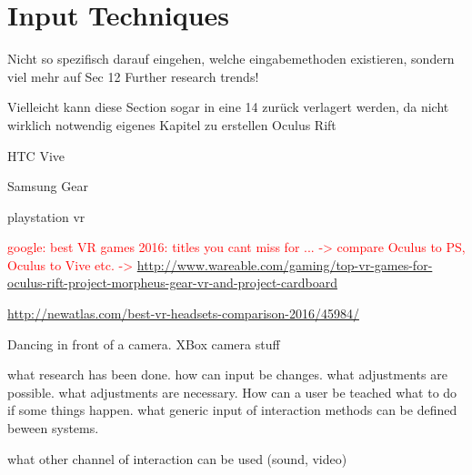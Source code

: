 \section{Input Techniques}
Nicht so spezifisch darauf eingehen, welche eingabemethoden existieren, sondern viel mehr auf Sec 12 Further research trends!

Vielleicht kann diese Section sogar in eine 14 zurück verlagert werden, da nicht wirklich notwendig eigenes Kapitel zu erstellen 
Oculus Rift

HTC Vive

Samsung Gear

playstation vr

\textcolor{red}{google: best VR games 2016: titles you cant miss for ... -> compare Oculus to PS, Oculus to Vive etc. -> \url{http://www.wareable.com/gaming/top-vr-games-for-oculus-rift-project-morpheus-gear-vr-and-project-cardboard}}

\url{http://newatlas.com/best-vr-headsets-comparison-2016/45984/}

Dancing in front of a camera. XBox camera stuff

what research has been done. how can input be changes. what adjustments are possible. what adjustments are necessary. How can a user be teached what to do if some things happen. what generic input of interaction methods can be defined beween systems.

what other channel of interaction can be used (sound, video)
